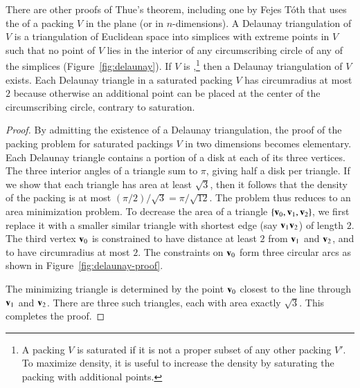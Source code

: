 
\bigskip

There are other proofs of Thue's theorem, including one by Fejes
T\'oth that uses the  of a packing $V$
in the plane (or in $n$-dimensions).  A Delaunay triangulation of $V$
is a triangulation of Euclidean space into simplices with extreme
points in $V$ such that no point of $V$ lies in the interior of any
circumscribing circle of any of the simplices (Figure~\ref{fig:delaunay}).  
If $V$ is
,\footnote{A packing $V$ is saturated if it is not
  a proper subset of any other packing $V'$.  To maximize density, it
  is useful to increase the density by saturating the packing with
  additional points.} then a Delaunay triangulation of
$V$ exists.  Each Delaunay triangle in a saturated packing $V$ has
circumradius at most $2$ because otherwise an additional point can be
placed at the center of the circumscribing circle, contrary to saturation.

\figANNTKZP %

\begin{proof}
  By admitting the existence of a Delaunay triangulation, the proof of
  the packing problem for saturated packings $V$ in two dimensions becomes
  elementary.  Each Delaunay triangle contains a portion of a disk at each of
  its three vertices.  The three interior angles of a triangle sum to
  $\pi$, giving half a disk per triangle.  If we show that each triangle has area
  at least $\sqrt{3}$, then it follows that the density of the packing is at most
  $(\pi/2)/\sqrt{3} = \pi/\sqrt{12}$.  The problem thus reduces to
  an area minimization problem.  To decrease the area of a triangle
  $\{{\mathbf v}_0,{\mathbf v}_1,{\mathbf v}_2\}$, we first replace it with a smaller similar
  triangle with shortest edge (say ${\mathbf v}_1{\mathbf v}_2$) of length $2$.  The
  third vertex ${\mathbf v}_0$ is constrained to have distance at least $2$
  from ${\mathbf v}_1$ and ${\mathbf v}_2$, and to have circumradius at most $2$.  The
  constraints on ${\mathbf v}_0$ form three circular arcs as shown in
  Figure~\ref{fig:delaunay-proof}.

\figCCKQLLH  %


The minimizing triangle is determined by the point ${\mathbf v}_0$ closest to
the line through ${\mathbf v}_1$ and ${\mathbf v}_2$.  There are three such triangles,
each with area exactly $\sqrt3$.  This completes the proof.
\end{proof}

